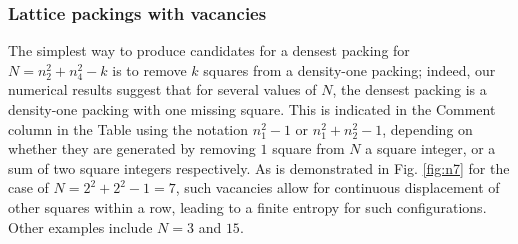 \documentclass[aps]{revtex4}
\begin{document}
\begin{figure}[H]
\caption{\label{fig:aligned}}
\end{figure} 

\subsubsection{Lattice packings with vacancies}
\label{sec:vacancies}
The simplest way to produce candidates for a densest packing for $N=n_2^2 + n_4^2-k$ is to remove $k$ squares from a density-one packing; indeed, our numerical results suggest that for several values of $N$, the densest packing is a density-one packing with one missing square.  This is indicated in the Comment column in the Table using the notation $n_1^2-1$ or $n_1^2+ n_2^2-1$, depending on whether they are generated by removing $1$ square from $N$ a square integer, or a sum of two square integers respectively.  As is demonstrated in Fig. \ref{fig:n7} for the case of $N=2^2+2^2-1=7$, such vacancies allow for continuous displacement of other squares within a row, leading to a finite entropy for such configurations.  Other examples include $N=3$ and $15$.
\end{document}
